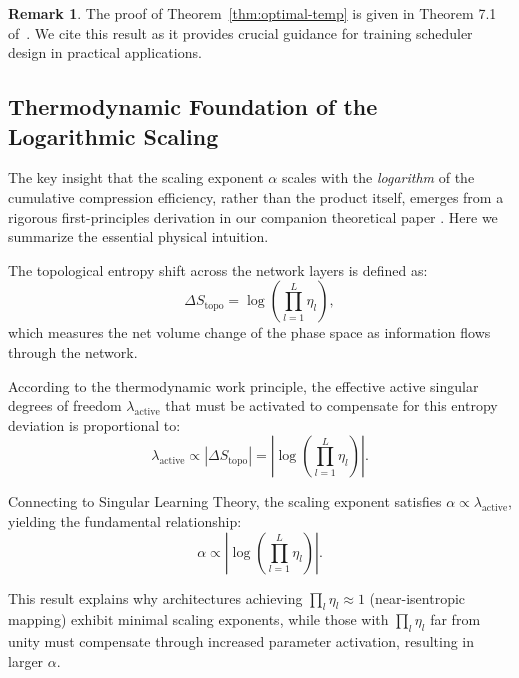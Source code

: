 \documentclass[11pt, a4paper]{article}
\theoremstyle{definition}
\newtheorem{remark}{Remark}[section]
\begin{document}
\begin{remark}
The proof of Theorem~\ref{thm:optimal-temp} is given in Theorem 7.1 of~\cite{liu2024unified}. We cite this result as it provides crucial guidance for training scheduler design in practical applications.
\end{remark}


\subsection{Thermodynamic Foundation of the Logarithmic Scaling}

The key insight that the scaling exponent $\alpha$ scales with the \emph{logarithm} of the cumulative compression efficiency, rather than the product itself, emerges from a rigorous first-principles derivation in our companion theoretical paper \cite{liu2024unified}. Here we summarize the essential physical intuition.

The topological entropy shift across the network layers is defined as:
\begin{equation}
\Delta S_{\text{topo}} = \log\left(\prod_{l=1}^{L} \eta_l\right),
\label{eq:topo_entropy_shift}
\end{equation}
which measures the net volume change of the phase space as information flows through the network.

According to the thermodynamic work principle, the effective active singular degrees of freedom $\lambda_{\text{active}}$ that must be activated to compensate for this entropy deviation is proportional to:
\begin{equation}
\lambda_{\text{active}} \propto |\Delta S_{\text{topo}}| = \left| \log\left(\prod_{l=1}^{L} \eta_l\right) \right|.
\label{eq:lambda_active}
\end{equation}

Connecting to Singular Learning Theory, the scaling exponent satisfies $\alpha \propto \lambda_{\text{active}}$, yielding the fundamental relationship:
\begin{equation}
\alpha \propto \left| \log\left(\prod_{l=1}^{L} \eta_l\right) \right|.
\label{eq:alpha_log_eta}
\end{equation}

This result explains why architectures achieving $\prod_l \eta_l \approx 1$ (near-isentropic mapping) exhibit minimal scaling exponents, while those with $\prod_l \eta_l$ far from unity must compensate through increased parameter activation, resulting in larger $\alpha$.
\end{document}
